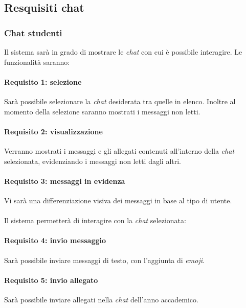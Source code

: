 \subsection{Resquisiti chat}
\subsubsection{Chat studenti}
Il sistema sarà in grado di mostrare le \emph{chat} con cui è possibile interagire. Le funzionalità saranno:

\paragraph{Requisito 1: selezione\\} 
Sarà possibile selezionare la \emph{chat} desiderata tra quelle in elenco. Inoltre al momento della selezione saranno mostrati i messaggi non letti.

\paragraph{Requisito 2: visualizzazione\\}
Verranno mostrati i messaggi e gli allegati contenuti all’interno della \emph{chat} selezionata, evidenziando i messaggi non letti dagli altri.

\paragraph{Requisito 3: messaggi in evidenza\\}
Vi sarà una differenziazione visiva dei messaggi in base al tipo di utente.\\
\\
Il sistema permetterà di interagire con la \emph{chat} selezionata:

\paragraph{Requisito 4: invio messaggio\\}
Sarà possibile inviare messaggi di testo, con l’aggiunta di \emph{emoji}.

\paragraph{Requisito 5: invio allegato\\}
Sarà possibile inviare allegati nella \emph{chat} dell’anno accademico.


